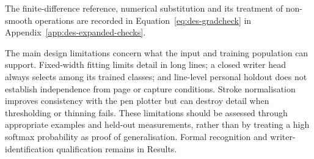 The finite-difference reference, numerical substitution and its treatment of non-smooth operations are recorded in Equation~\ref{eq:des-gradcheck} in Appendix~\ref{app:des-expanded-checks}.

The main design limitations concern what the input and training population can support. Fixed-width fitting limits detail in long lines; a closed writer head always selects among its trained classes; and line-level personal holdout does not establish independence from page or capture conditions. Stroke normalisation improves consistency with the pen plotter but can destroy detail when thresholding or thinning fails. These limitations should be assessed through appropriate examples and held-out measurements, rather than by treating a high softmax probability as proof of generalisation. Formal recognition and writer-identification qualification remains in Results.~\cite[recognise.py; train.py; trainlibrary.py]{braunepipeline2026}
\FloatBarrier
